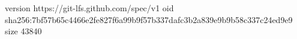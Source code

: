version https://git-lfs.github.com/spec/v1
oid sha256:7bf57b65c4466e2fe827f6a99b9f57b337dafc3b2a839e9b9b58c337c24ed9e9
size 43840

